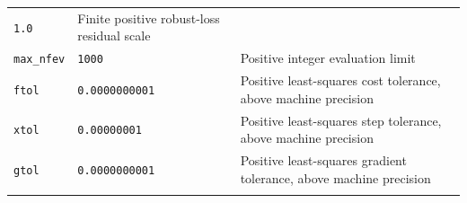 \documentclass[
  10pt,
  a4paper,
  oneside]{scrreprt}
\begin{document}
\begin{longtable}[]{@{}lll@{}}
\begin{minipage}[t]{0.30\columnwidth}
\texttt{1.0}\strut
\end{minipage} & \begin{minipage}[t]{0.30\columnwidth}\raggedright
Finite positive robust-loss residual scale\strut
\end{minipage}\tabularnewline
\begin{minipage}[t]{0.30\columnwidth}\raggedright
\texttt{max\_nfev}\strut
\end{minipage} & \begin{minipage}[t]{0.30\columnwidth}\raggedright
\texttt{1000}\strut
\end{minipage} & \begin{minipage}[t]{0.30\columnwidth}\raggedright
Positive integer evaluation limit\strut
\end{minipage}\tabularnewline
\begin{minipage}[t]{0.30\columnwidth}\raggedright
\texttt{ftol}\strut
\end{minipage} & \begin{minipage}[t]{0.30\columnwidth}\raggedright
\texttt{0.0000000001}\strut
\end{minipage} & \begin{minipage}[t]{0.30\columnwidth}\raggedright
Positive least-squares cost tolerance, above machine precision\strut
\end{minipage}\tabularnewline
\begin{minipage}[t]{0.30\columnwidth}\raggedright
\texttt{xtol}\strut
\end{minipage} & \begin{minipage}[t]{0.30\columnwidth}\raggedright
\texttt{0.00000001}\strut
\end{minipage} & \begin{minipage}[t]{0.30\columnwidth}\raggedright
Positive least-squares step tolerance, above machine precision\strut
\end{minipage}\tabularnewline
\begin{minipage}[t]{0.30\columnwidth}\raggedright
\texttt{gtol}\strut
\end{minipage} & \begin{minipage}[t]{0.30\columnwidth}\raggedright
\texttt{0.0000000001}\strut
\end{minipage} & \begin{minipage}[t]{0.30\columnwidth}\raggedright
Positive least-squares gradient tolerance, above machine precision\strut
\end{minipage}\tabularnewline
\begin{minipage}[t]{0.30\columnwidth}\raggedright

\end{minipage}
\end{longtable}
\end{document}

